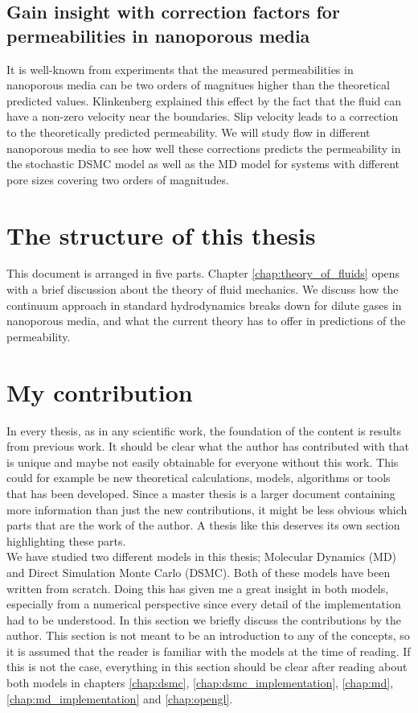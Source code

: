 \subsection{Gain insight with correction factors for permeabilities in nanoporous media}
It is well-known from experiments that the measured permeabilities in nanoporous media can be two orders of magnitues higher than the theoretical predicted values. Klinkenberg explained this effect by the fact that the fluid can have a non-zero velocity near the boundaries\cite{klinkenberg1941permeability}. Slip velocity leads to a correction to the theoretically predicted permeability. We will study flow in different nanoporous media to see how well these corrections predicts the permeability in the stochastic DSMC model as well as the MD model for systems with different pore sizes covering two orders of magnitudes.
\renewcommand{\thesubsection}{\thesection.\arabic{subsection}}
\section{The structure of this thesis}
This document is arranged in five parts. Chapter \ref{chap:theory_of_fluids} opens with a brief discussion about the theory of fluid mechanics. We discuss how the continuum approach in standard hydrodynamics breaks down for dilute gases in nanoporous media, and what the current theory has to offer in predictions of the permeability. 

\section{My contribution}
In every thesis, as in any scientific work, the foundation of the content is results from previous work. It should be clear what the author has contributed with that is unique and maybe not easily obtainable for everyone without this work. This could for example be new theoretical calculations, models, algorithms or tools that has been developed. Since a master thesis is a larger document containing more information than just the new contributions, it might be less obvious which parts that are the work of the author. A thesis like this deserves its own section highlighting these parts.\\
We have studied two different models in this thesis; Molecular Dynamics (MD) and Direct Simulation Monte Carlo (DSMC). Both of these models have been written from scratch. Doing this has given me a great insight in both models, especially from a numerical perspective since every detail of the implementation had to be understood. In this section we briefly discuss the contributions by  the author. This section is not meant to be an introduction to any of the concepts, so it is assumed that the reader is familiar with the models at the time of reading. If this is not the case, everything in this section should be clear after reading about both models in chapters \ref{chap:dsmc}, \ref{chap:dsmc_implementation}, \ref{chap:md}, \ref{chap:md_implementation} and \ref{chap:opengl}.
